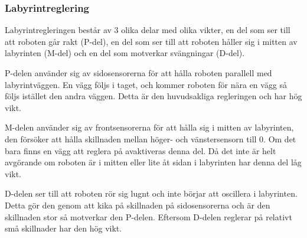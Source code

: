 \subsubsection{Labyrintreglering}
Labyrintregleringen består av 3 olika delar med olika vikter,
en del som ser till att roboten går rakt (P-del), en del som ser till att
roboten håller sig i mitten av labyrinten (M-del) och en del som motverkar
svängningar (D-del).


P-delen använder sig av sidosensorerna för att hålla roboten parallell med
labyrintväggen. En vägg följs i taget, och kommer roboten för nära en vägg så
följs istället den andra väggen. Detta är den huvudsakliga regleringen och har
hög vikt.


M-delen använder sig av frontsensorerna för att hålla sig i mitten av
labyrinten, den försöker att hålla skillnaden mellan höger- och vänstersensorn
till 0. Om det bara finns en vägg att reglera på avaktiveras denna del. Då det
inte är helt avgörande om roboten är i mitten eller lite åt sidan i labyrinten
har denna del låg vikt.


D-delen ser till att roboten rör sig lugnt och inte börjar att oscillera i
labyrinten. Detta gör den genom att kika på skillnaden på sidosensorerna och är
den skillnaden stor så motverkar den P-delen. Eftersom D-delen reglerar på
relativt små skillnader har den hög vikt.

\label{reglering}
